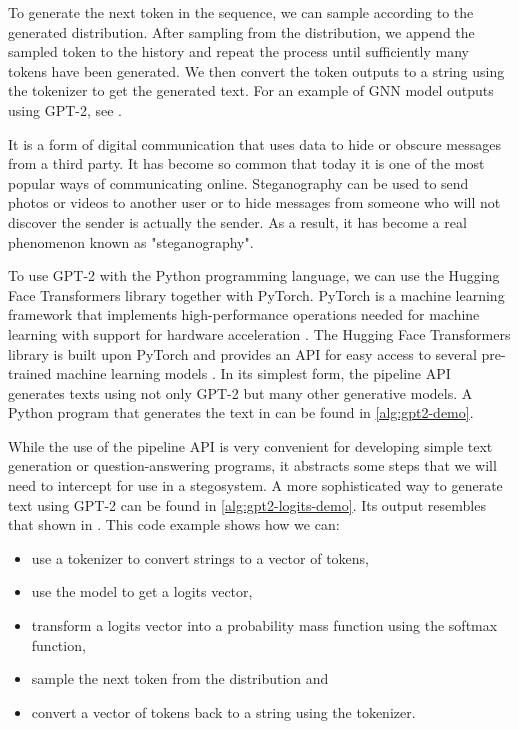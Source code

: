 To generate the next token in the sequence, we can sample according to the generated distribution.
After sampling from the distribution, we append the sampled token to the history and repeat the process until sufficiently many tokens have been generated.
We then convert the token outputs to a string using the tokenizer to get the generated text.
For an example of GNN model outputs using GPT-2, see .

\begin{example}
It is a form of digital communication that uses data to hide or obscure messages from a third party. It has become so common that today it is one of the most popular ways of communicating online. Steganography can be used to send photos or videos to another user or to hide messages from someone who will not discover the sender is actually the sender. As a result, it has become a real phenomenon known as "steganography".
  \label{example:gpt2-output-sample}
\end{example}

To use GPT-2 with the Python programming language, we can use the Hugging Face Transformers library together with PyTorch.
PyTorch is a machine learning framework that implements high-performance operations needed for machine learning with support for hardware acceleration \cite{PyTorch}.
The Hugging Face Transformers library is built upon PyTorch and provides an API for easy access to several pre-trained machine learning models \cite{HFTransformers}.
In its simplest form, the pipeline API generates texts using not only GPT-2 but many other generative models. 
A Python program that generates the text in  can be found in \autoref{alg:gpt2-demo}.

While the use of the pipeline API is very convenient for developing simple text generation or question-answering programs, it abstracts some steps that we will need to intercept for use in a stegosystem.
A more sophisticated way to generate text using GPT-2 can be found in \autoref{alg:gpt2-logits-demo}.
Its output resembles that shown in . 
This code example shows how we can:

\begin{itemize}
  \item use a tokenizer to convert strings to a vector of tokens,
  \item use the model to get a logits vector,
  \item transform a logits vector into a probability mass function using the softmax function,
  \item sample the next token from the distribution and
  \item convert a vector of tokens back to a string using the tokenizer.
\end{itemize}


